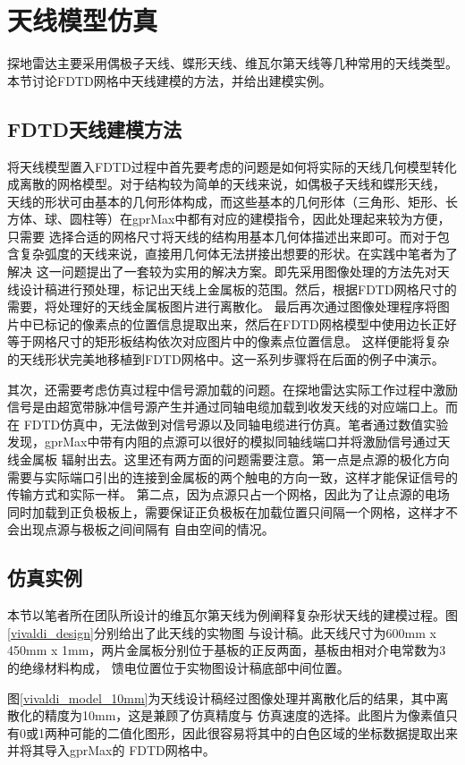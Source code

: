 \section{天线模型仿真}
探地雷达主要采用偶极子天线、蝶形天线、维瓦尔第天线等几种常用的天线类型。本节讨论FDTD网格中天线建模的方法，并给出建模实例。
\subsection{FDTD天线建模方法}
将天线模型置入FDTD过程中首先要考虑的问题是如何将实际的天线几何模型转化成离散的网格模型。对于结构较为简单的天线来说，如偶极子天线和蝶形天线，
天线的形状可由基本的几何形体构成，而这些基本的几何形体（三角形、矩形、长方体、球、圆柱等）在gprMax中都有对应的建模指令，因此处理起来较为方便，只需要
选择合适的网格尺寸将天线的结构用基本几何体描述出来即可。而对于包含复杂弧度的天线来说，直接用几何体无法拼接出想要的形状。在实践中笔者为了解决
这一问题提出了一套较为实用的解决方案。即先采用图像处理的方法先对天线设计稿进行预处理，标记出天线上金属板的范围。然后，根据FDTD网格尺寸的需要，将处理好的天线金属板图片进行离散化。
最后再次通过图像处理程序将图片中已标记的像素点的位置信息提取出来，然后在FDTD网格模型中使用边长正好等于网格尺寸的矩形板结构依次对应图片中的像素点位置信息。
这样便能将复杂的天线形状完美地移植到FDTD网格中。这一系列步骤将在后面的例子中演示。

其次，还需要考虑仿真过程中信号源加载的问题。在探地雷达实际工作过程中激励信号是由超宽带脉冲信号源产生并通过同轴电缆加载到收发天线的对应端口上。而在
FDTD仿真中，无法做到对信号源以及同轴电缆进行仿真。笔者通过数值实验发现，gprMax中带有内阻的点源可以很好的模拟同轴线端口并将激励信号通过天线金属板
辐射出去。这里还有两方面的问题需要注意。第一点是点源的极化方向需要与实际端口引出的连接到金属板的两个触电的方向一致，这样才能保证信号的传输方式和实际一样。
第二点，因为点源只占一个网格，因此为了让点源的电场同时加载到正负极板上，需要保证正负极板在加载位置只间隔一个网格，这样才不会出现点源与极板之间间隔有
自由空间的情况。

\subsection{仿真实例}
本节以笔者所在团队所设计的维瓦尔第天线为例阐释复杂形状天线的建模过程。图\ref{vivaldi_design}分别给出了此天线的实物图
与设计稿。此天线尺寸为600mm x 450mm x 1mm，两片金属板分别位于基板的正反两面，基板由相对介电常数为3的绝缘材料构成，
馈电位置位于实物图设计稿底部中间位置。

图\ref{vivaldi_model_10mm}为天线设计稿经过图像处理并离散化后的结果，其中离散化的精度为10mm，这是兼顾了仿真精度与
仿真速度的选择。此图片为像素值只有0或1两种可能的二值化图形，因此很容易将其中的白色区域的坐标数据提取出来并将其导入gprMax的
FDTD网格中。

